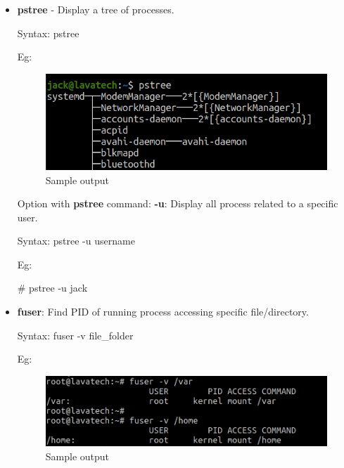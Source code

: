 \begin{flushleft}
\begin{itemize}
\begin{itemize}
		\end{itemize}
	
	\newpage
	\item \textbf{pstree} - Display a tree of processes.
	\bigskip
	\begin{tcolorbox}[breakable,notitle,boxrule=-0pt,colback=pink,colframe=pink]
		\color{black}
		\font=9pt
		Syntax: pstree
		\font=4pt
	\end{tcolorbox}
	
	Eg:
	\begin{figure}[h!]
		\centering
		\includegraphics[scale=.4]{content/chapter12/images/pstree.png}
		\caption{Sample output}
		\label{fig:process2345492}
	\end{figure}
	Option with \textbf{pstree} command:
	\newline
	\textbf{-u}: Display all process related to a specific user.
	\bigskip
	\begin{tcolorbox}[breakable,notitle,boxrule=-0pt,colback=pink,colframe=pink]
		\color{black}
		\font=9pt
		Syntax: pstree -u username
		\font=4pt
	\end{tcolorbox}
	
	Eg:
	\begin{tcolorbox}[breakable,notitle,boxrule=-0pt,colback=black,colframe=black]
		\color{green}
		\font=9pt
		\# pstree -u jack
		\font=4pt
	\end{tcolorbox}
	
	
	\bigskip
	\bigskip
	
	\item \textbf{fuser}: Find PID of running process accessing specific file/directory.
	\bigskip
	\begin{tcolorbox}[breakable,notitle,boxrule=-0pt,colback=pink,colframe=pink]
		\color{black}
		\font=9pt
		Syntax: fuser -v file\_folder
		\font=4pt
	\end{tcolorbox}

	Eg:
	\begin{figure}[h!]
		\centering
		\includegraphics[scale=.4]{content/chapter12/images/fuser.png}
		\caption{Sample output}
		\label{fig:process2345492}
	\end{figure}
	

\end{itemize}
\end{flushleft}
